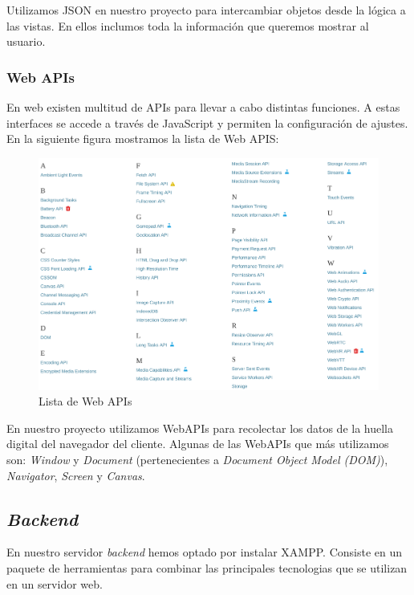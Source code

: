 Utilizamos JSON en nuestro proyecto para intercambiar objetos desde la lógica a las vistas. En ellos inclumos toda la información que queremos mostrar al usuario. \par

\subsubsection{Web APIs}
En web existen multitud de APIs para llevar a cabo distintas funciones. A estas interfaces se accede a través de JavaScript y permiten la configuración de ajustes. En la siguiente figura mostramos la lista de Web APIS: \par 

\begin{figure}[tbp]
	\centering
	\includegraphics[width=1\textwidth]{Images/webapis.png}
	\caption{Lista de Web APIs}
	\label{fig:webAPIs}
\end{figure}

En nuestro proyecto utilizamos WebAPIs para recolectar los datos de la huella digital del navegador del cliente. Algunas de las WebAPIs que más utilizamos son: \textit{Window} y \textit{Document} (pertenecientes a \textit{Document Object Model (DOM)}), \textit{Navigator}, \textit{Screen} y \textit{Canvas}. \par 


\subsection{\textit{Backend}}

En nuestro servidor \textit{backend} hemos optado por instalar XAMPP. Consiste en un paquete de herramientas para combinar las principales tecnologias que se utilizan en un servidor web. \par 

